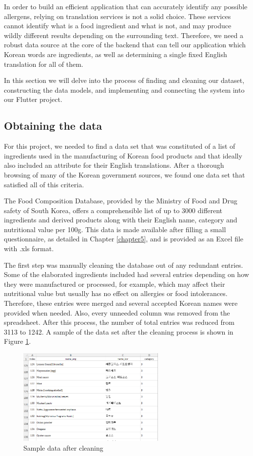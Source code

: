 In order to build an efficient application that can accurately identify any possible allergens, relying on translation services is not a solid choice. These services cannot identify what is a food ingredient and what is not, and may produce wildly different results depending on the surrounding text. Therefore, we need a robust data source at the core of the backend that can tell our application which Korean words are ingredients, as well as determining a single fixed English translation for all of them.

In this section we will delve into the process of finding and cleaning our dataset, constructing the data models, and implementing and connecting the system into our Flutter project.

\subsection{Obtaining the data}

For this project, we needed to find a data set that was constituted of a list of ingredients used in the manufacturing of Korean food products and that ideally also included an attribute for their English translations. After a thorough browsing of many of the Korean government sources, we found one data set that satisfied all of this criteria.

The Food Composition Database, provided by the Ministry of Food and Drug safety of South Korea, offers a comprehensible list of up to 3000 different ingredients and derived products along with their English name, category and nutritional value per 100g. This data is made available after filling a small questionnaire, as detailed in Chapter \ref{chapter5}, and is provided as an Excel file with .xls format.

The first step was manually cleaning the database out of any redundant entries. Some of the elaborated ingredients included had several entries depending on how they were manufactured or processed, for example, which may affect their nutritional value but usually has no effect on allergies or food intolerances. Therefore, these entries were merged and several accepted Korean names were provided when needed. Also, every unneeded column was removed from the spreadsheet. After this process, the number of total entries was reduced from 3113 to 1242. A sample of the data set after the cleaning process is shown in Figure \ref{fig:data-dblike}.

\begin{figure}[h]
  \centering
  \includegraphics[width=0.65\textwidth]{Figures/data-dblike.png}
  \caption{
    Sample data after cleaning
  }
  \label{fig:data-dblike}
\end{figure}

